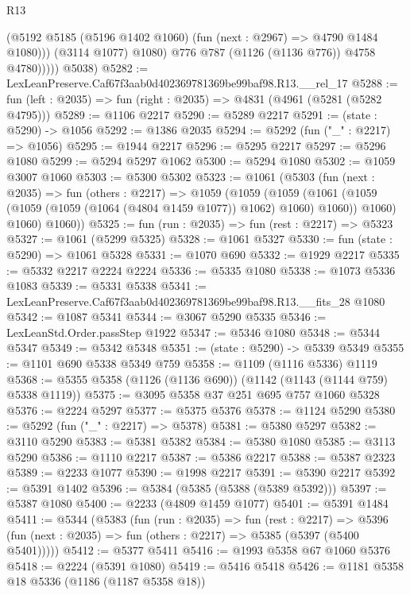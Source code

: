 \begin{lexlean}{R13}
\begin{coremodule}
                    (@5192 @5185 (@5196 @1402 @1060) (fun (next : @2967) => @4790 @1484 @1080)))
                  (@3114 @1077)
                  @1080)
                @776
                @787
                (@1126 (@1136 @776))
                @4758
                @4780)))))
      @5038)
@5282 := LexLeanPreserve.Caf67f3aab0d402369781369be99baf98.R13.__rel_17
@5288 := fun (left : @2035) => fun (right : @2035) => @4831 (@4961 (@5281 (@5282 @4795)))
@5289 := @1106 @2217
@5290 := @5289 @2217
@5291 := (state : @5290) -> @1056
@5292 := @1386 @2035
@5294 := @5292 (fun ("_" : @2217) => @1056)
@5295 := @1944 @2217
@5296 := @5295 @2217
@5297 := @5296 @1080
@5299 := @5294 @5297 @1062
@5300 := @5294 @1080
@5302 := @1059 @3007 @1060
@5303 := @5300 @5302
@5323 := @1061
    (@5303
      (fun (next : @2035) =>
      fun (others : @2217) =>
      @1059
        (@1059
          (@1059
            (@1061 (@1059 (@1059 (@1059 (@1064 (@4804 @1459 @1077)) @1062) @1060) @1060))
            @1060)
          @1060)
        @1060))
@5325 := fun (run : @2035) => fun (rest : @2217) => @5323
@5327 := @1061 (@5299 @5325)
@5328 := @1061 @5327
@5330 := fun (state : @5290) => @1061 @5328
@5331 := @1070 @690
@5332 := @1929 @2217
@5335 := @5332 @2217 @2224 @2224
@5336 := @5335 @1080
@5338 := @1073 @5336 @1083
@5339 := @5331 @5338
@5341 := LexLeanPreserve.Caf67f3aab0d402369781369be99baf98.R13.__fits_28 @1080
@5342 := @1087 @5341
@5344 := @3067 @5290 @5335
@5346 := LexLeanStd.Order.passStep @1922
@5347 := @5346 @1080
@5348 := @5344 @5347
@5349 := @5342 @5348
@5351 := (state : @5290) -> @5339 @5349
@5355 := @1101 @690 @5338 @5349 @759
@5358 := @1109 (@1116 @5336) @1119
@5368 := @5355 @5358 (@1126 (@1136 @690)) (@1142 (@1143 (@1144 @759) @5338 @1119))
@5375 := @3095 @5358 @37 @251 @695 @757 @1060 @5328
@5376 := @2224 @5297
@5377 := @5375 @5376
@5378 := @1124 @5290
@5380 := @5292 (fun ("_" : @2217) => @5378)
@5381 := @5380 @5297
@5382 := @3110 @5290
@5383 := @5381 @5382
@5384 := @5380 @1080
@5385 := @3113 @5290
@5386 := @1110 @2217
@5387 := @5386 @2217
@5388 := @5387 @2323
@5389 := @2233 @1077
@5390 := @1998 @2217
@5391 := @5390 @2217
@5392 := @5391 @1402
@5396 := @5384 (@5385 (@5388 (@5389 @5392)))
@5397 := @5387 @1080
@5400 := @2233 (@4809 @1459 @1077)
@5401 := @5391 @1484
@5411 := @5344
    (@5383
      (fun (run : @2035) =>
      fun (rest : @2217) =>
      @5396 (fun (next : @2035) => fun (others : @2217) => @5385 (@5397 (@5400 @5401)))))
@5412 := @5377 @5411
@5416 := @1993 @5358 @67 @1060 @5376
@5418 := @2224 (@5391 @1080)
@5419 := @5416 @5418
@5426 := @1181 @5358 @18 @5336 (@1186 (@1187 @5358 @18))

\end{coremodule}
\end{lexlean}
